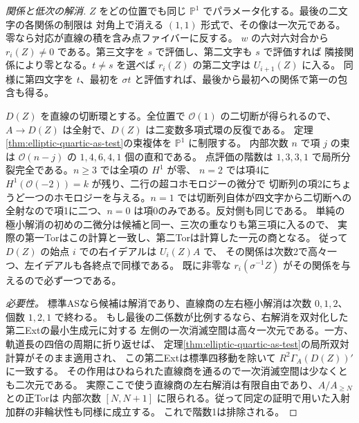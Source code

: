 \begin{proof}[関係と低次の解消]
$Z$ をどの位置でも同じ $\mathbb P^1$ でパラメータ化する。最後の二文字の各関係の制限は
対角上で消える $(1,1)$ 形式で、その像は一次元である。零なら対応が直線の積を含み点ファイバーに反する。
$w$ の六対六対合から $r_i(Z)\ne0$ である。第三文字を $s$ で評価し、第二文字も $s$ で評価すれば
隣接関係により零となる。$t\ne s$ を選べば $r_i(Z)$ の第二文字は $U_{i+1}(Z)$ に入る。
同様に第四文字を $t$、最初を $\sigma t$ と評価すれば、最後から最初への関係で第一の包含も得る。

$D(Z)$ を直線の切断環とする。全位置で $\mathcal O(1)$ の二切断が得られるので、
$A\to D(Z)$ は全射で、$D(Z)$ は二変数多項式環の反復である。
定理\ref{thm:elliptic-quartic-as-test}の束複体を $\mathbb P^1$ に制限する。
内部次数 $n$ で項 $j$ の束は $\mathcal O(n-j)$ の $1,4,6,4,1$ 個の直和である。
点評価の階数は $1,3,3,1$ で局所分裂完全である。$n\ge3$ では全項の $H^1$ が零、
$n=2$ では項4に $H^1(\mathcal O(-2))=k$ が残り、二行の超コホモロジーの微分で
切断列の項2にちょうど一つのホモロジーを与える。$n=1$ では切断列自体が四文字から二切断への
全射なので項1に二つ、$n=0$ は項0のみである。反対側も同じである。
単純の極小解消の初めの二微分は候補と同一、三次の重なりも第三項に入るので、
実際の第一Torはこの計算と一致し、第二Torは計算した一元の商となる。
従って $D(Z)$ の始点 $i$ での右イデアルは $U_i(Z)A$ で、
その関係は次数2で高々一つ、左イデアルも各終点で同様である。
既に非零な $r_i(\sigma^{-1} Z)$ がその関係を与えるので必ず一つである。

\smallskip
\noindent\textit{必要性。}
標準ASなら候補は解消であり、直線商の左右極小解消は次数 $0,1,2$、個数 $1,2,1$ で終わる。
もし最後の二係数が比例するなら、右解消を双対化した第二Extの最小生成元に対する
左側の一次消滅空間は高々一次元である。一方、軌道長の四倍の周期に折り返せば、
定理\ref{thm:elliptic-quartic-as-test}の局所双対計算がそのまま適用され、
この第二Extは標準四移動を除いて $R^2\Gamma_A(D(Z))'$ に一致する。
その作用はひねられた直線商を通るので一次消滅空間は少なくとも二次元である。
実際ここで使う直線商の左右解消は有限自由であり、$A/A_{\ge N}$ との正Torは
内部次数 $[N,N+1]$ に限られる。従って同定の証明で用いた入射加群の非輪状性も同様に成立する。
これで階数1は排除される。


\end{proof}
